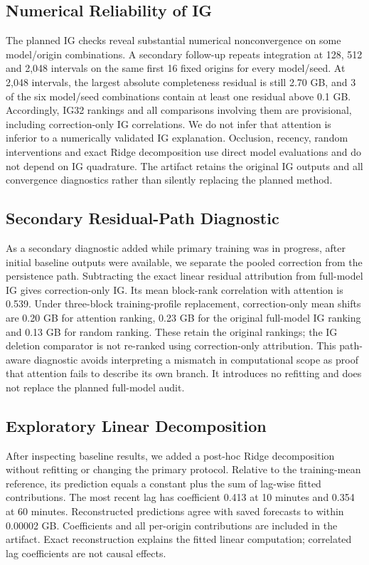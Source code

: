 \documentclass[conference]{IEEEtran}
\begin{document}
\subsection{Numerical Reliability of IG}
The planned IG checks reveal substantial numerical nonconvergence on some model/origin combinations. A secondary follow-up repeats integration at 128, 512 and 2,048 intervals on the same first 16 fixed origins for every model/seed. At 2,048 intervals, the largest absolute completeness residual is still 2.70 GB, and 3 of the six model/seed combinations contain at least one residual above 0.1 GB. Accordingly, IG32 rankings and all comparisons involving them are provisional, including correction-only IG correlations. We do not infer that attention is inferior to a numerically validated IG explanation. Occlusion, recency, random interventions and exact Ridge decomposition use direct model evaluations and do not depend on IG quadrature. The artifact retains the original IG outputs and all convergence diagnostics rather than silently replacing the planned method.

\subsection{Secondary Residual-Path Diagnostic}
As a secondary diagnostic added while primary training was in progress, after initial baseline outputs were available, we separate the pooled correction from the persistence path. Subtracting the exact linear residual attribution from full-model IG gives correction-only IG. Its mean block-rank correlation with attention is 0.539. Under three-block training-profile replacement, correction-only mean shifts are 0.20 GB for attention ranking, 0.23 GB for the original full-model IG ranking and 0.13 GB for random ranking. These retain the original rankings; the IG deletion comparator is not re-ranked using correction-only attribution. This path-aware diagnostic avoids interpreting a mismatch in computational scope as proof that attention fails to describe its own branch. It introduces no refitting and does not replace the planned full-model audit.

\subsection{Exploratory Linear Decomposition}
After inspecting baseline results, we added a post-hoc Ridge decomposition without refitting or changing the primary protocol. Relative to the training-mean reference, its prediction equals a constant plus the sum of lag-wise fitted contributions. The most recent lag has coefficient 0.413 at 10 minutes and 0.354 at 60 minutes. Reconstructed predictions agree with saved forecasts to within 0.00002 GB. Coefficients and all per-origin contributions are included in the artifact. Exact reconstruction explains the fitted linear computation; correlated lag coefficients are not causal effects.
\end{document}
